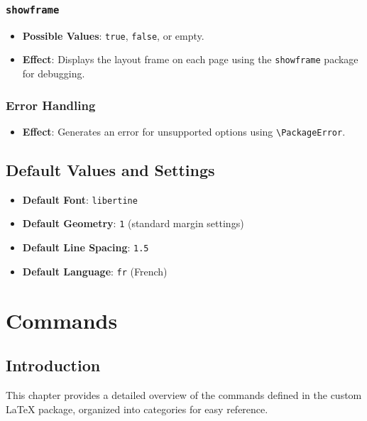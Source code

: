 \documentclass[12pt,twoside]{report}
\begin{document}
\subsection{\texttt{showframe}}
\begin{itemize}
    \item \textbf{Possible Values}: \texttt{true}, \texttt{false}, or empty.
    \item \textbf{Effect}: Displays the layout frame on each page using the \texttt{showframe} package for debugging.
\end{itemize}

\subsection{Error Handling}
\begin{itemize}
    \item \textbf{Effect}: Generates an error for unsupported options using \texttt{\textbackslash PackageError}.
\end{itemize}

\section*{Default Values and Settings}
\begin{itemize}
    \item \textbf{Default Font}: \texttt{libertine}
    \item \textbf{Default Geometry}: \texttt{1} (standard margin settings)
    \item \textbf{Default Line Spacing}: \texttt{1.5}
    \item \textbf{Default Language}: \texttt{fr} (French)
\end{itemize}

\chapter{Commands}
\section{Introduction}
This chapter provides a detailed overview of the commands defined in the custom LaTeX package, organized into categories for easy reference.
\end{document}
